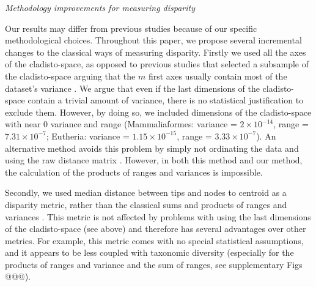 \documentclass[12pt,letterpaper]{article}
\renewcommand{\subsection}[1]{%
\bigskip
\begin{center}
\begin{large}
\normalfont\itshape #1
\end{large}
\end{center}}
\begin{document}
\subsection{Methodology improvements for measuring disparity}
Our results may differ from previous studies because of our specific methodological choices.
Throughout this paper, we propose several incremental changes to the classical ways of measuring disparity.
Firstly we used all the axes of the cladisto-space, as opposed to previous studies that selected a subsample of the cladisto-space arguing that the $m$ first axes usually contain most of the dataset's variance \citep[e.g][]{brusatte50,cisneros2010,prentice2011,anderson2012using,Hughes20082013,bentonmodels2014}.
We argue that even if the last dimensions of the cladisto-space contain a trivial amount of variance, there is no statistical justification to exclude them.
However, by doing so, we included dimensions of the cladisto-space with near $0$ variance and range (Mammaliaformes: variance = $2\times10^{-14}$, range = $7.31\times10^{-7}$; Eutheria: variance = $1.15\times10^{-15}$, range = $3.33\times10^{-7}$).
An alternative method avoids this problem by simply not ordinating the data and using the raw distance matrix \citep[e.g.][]{bensonfaunal2014,Close2015}. 
However, in both this method and our method, the calculation of the products of ranges and variances is impossible.

Secondly, we used median distance between tips and nodes to centroid as a disparity metric, rather than the classical sums and products of ranges and variances \citep{Wills1994}.
This metric is not affected by problems with using the last dimensions of the cladisto-space (see above) and therefore has several advantages over other metrics. %
For example, this metric comes with no special statistical assumptions, and it appears to be less coupled with taxonomic diversity %
(especially for the products of ranges and variance and the sum of ranges, see supplementary Figs @@@).
\end{document}
